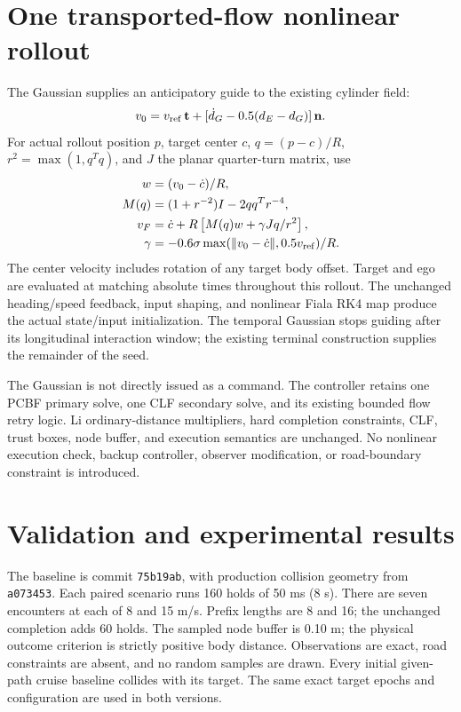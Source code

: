\documentclass[11pt]{article}
\begin{document}
\section{One transported-flow nonlinear rollout}
The Gaussian supplies an anticipatory guide to the existing cylinder field:
\[
 v_0=v_{\rm ref}\,\mathbf t+
       [\dot d_G-0.5(d_E-d_G)]\,\mathbf n.
\]
For actual rollout position $p$, target center $c$, $q=(p-c)/R$,
$r^2=\max(1,q^Tq)$, and $J$ the planar quarter-turn matrix, use
\begin{align*}
 w&=(v_0-\dot c)/R,\\
 M(q)&=(1+r^{-2})I-2qq^Tr^{-4},\\
 v_F&=\dot c+R\left[M(q)w+\gamma Jq/r^2\right],\\
 \gamma&=-0.6\sigma\max(\|v_0-\dot c\|,0.5v_{\rm ref})/R.
\end{align*}
The center velocity includes rotation of any target body offset. Target and
ego are evaluated at matching absolute times throughout this rollout. The
unchanged heading/speed feedback, input shaping, and nonlinear Fiala RK4 map
produce the actual state/input initialization. The temporal Gaussian stops
guiding after its longitudinal interaction window; the existing terminal
construction supplies the remainder of the seed.

The Gaussian is not directly issued as a command. The controller retains
one PCBF primary solve, one CLF secondary solve, and its existing bounded flow
retry logic. Li ordinary-distance multipliers, hard completion constraints,
CLF, trust boxes, node buffer, and execution semantics are unchanged. No
nonlinear execution check, backup controller, observer modification, or
road-boundary constraint is introduced.

\section{Validation and experimental results}
The baseline is commit \texttt{75b19ab}, with production collision geometry
from \texttt{a073453}. Each paired scenario runs 160 holds of 50 ms (8 s).
There are seven encounters at each of 8 and 15 m/s. Prefix lengths are 8 and
16; the unchanged completion adds 60 holds. The sampled node buffer is
0.10 m; the physical outcome criterion is strictly positive body distance.
Observations are exact, road constraints are absent, and no random samples
are drawn. Every initial given-path cruise baseline collides with its target.
The same exact target epochs and configuration are used in both versions.
\end{document}
